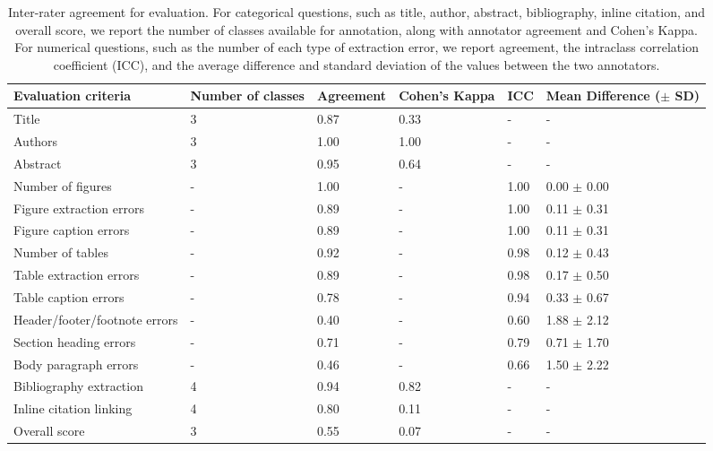\begin{table}[tb!]
    \centering
    \begin{tabularx}{0.94\linewidth}{L{40mm}L{15mm}L{15mm}L{15mm}L{15mm}L{25mm}}
        \toprule
        Evaluation criteria & Number of classes & Agreement & Cohen's Kappa & ICC & Mean Difference ($\pm$ SD) \\
        \midrule
        Title & 3 & 0.87 & 0.33 & - & - \\
        Authors & 3 & 1.00 & 1.00 & - & - \\
        Abstract & 3 & 0.95 & 0.64 & - & - \\
        \midrule
        Number of figures & - & 1.00 & - & 1.00 & 0.00 $\pm$ 0.00 \\
        Figure extraction errors & - & 0.89 & - & 1.00 & 0.11 $\pm$ 0.31 \\
        Figure caption errors & - & 0.89 & - & 1.00 & 0.11 $\pm$ 0.31 \\
        Number of tables & - & 0.92 & - & 0.98 & 0.12 $\pm$ 0.43 \\
        Table extraction errors & - & 0.89 & - & 0.98 & 0.17 $\pm$ 0.50 \\
        Table caption errors & - & 0.78 & - & 0.94 & 0.33 $\pm$ 0.67 \\
        \midrule
        Header/footer/footnote errors & - & 0.40 & - & 0.60 & 1.88 $\pm$ 2.12 \\
        Section heading errors & - & 0.71 & - & 0.79 & 0.71 $\pm$ 1.70 \\
        Body paragraph errors & - & 0.46 & - & 0.66 & 1.50 $\pm$ 2.22 \\
        \midrule
        Bibliography extraction & 4 & 0.94 & 0.82 & - & - \\
        Inline citation linking & 4 & 0.80 & 0.11 & - & - \\
        \midrule
        Overall score & 3 & 0.55 & 0.07 & - & - \\
        \bottomrule
    \end{tabularx}
    \caption{Inter-rater agreement for evaluation. For categorical questions, such as title, author, abstract, bibliography, inline citation, and overall score, we report the number of classes available for annotation, along with annotator agreement and Cohen's Kappa. For numerical questions, such as the number of each type of extraction error, we report agreement, the intraclass correlation coefficient (ICC), and the average difference and standard deviation of the values between the two annotators.}

\end{table}

